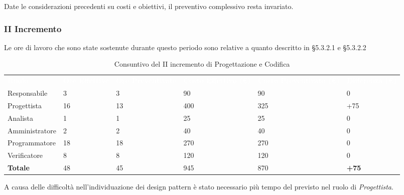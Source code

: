 Date le considerazioni precedenti su costi e obiettivi, il preventivo complessivo resta invariato.

\pagebreak


\subsubsection{II Incremento}
Le ore di lavoro che sono state sostenute durante questo periodo sono relative a quanto descritto in §5.3.2.1 e §5.3.2.2

\begin{table}[H]
\begin{center}
\renewcommand{\arraystretch}{1.5}
\begin{tabular}{ m{}<{\centering}  m{}<{\centering} m{}<{\centering} m{}<{\centering} m{}<{\centering} m{}<{\centering}}	\rowcolor{darkblue}
	\textcolor{white}{\textbf{Ruolo}} & \textcolor{white}{\textbf{Ore Effettive}} & \textcolor{white}{\textbf{Ore Preventivate}}&\textcolor{white}{\textbf{Costo Effettivo (\euro)}}&\textcolor{white}{\textbf{Costo Preventivato (\euro)}}&\textcolor{white}{\textbf{Differenza (\euro)}}\\ 

	Responsabile  & 3 & 3 & 90 & 90 & 0\\	
	
	Progettista & 16 & 13 & 400 & 325 & +75\\
	
	Analista & 1 & 1 & 25 & 25 & 0\\
	
	Amministratore & 2 & 2 & 40 & 40 & 0\\
	
	Programmatore & 18 & 18 & 270 & 270 & 0\\
	
	Verificatore & 8 & 8 & 120 & 120 & 0\\
	
	\textbf{Totale} & 48 & 45 & 945 & 870 & \textbf{+75} \\
	
\end{tabular}
\caption{Consuntivo del II incremento di Progettazione e Codifica}
\end{center}
\end{table}

A causa delle difficoltà nell'individuazione dei design pattern è stato necessario più tempo del previsto nel ruolo di \textit{Progettista}.

